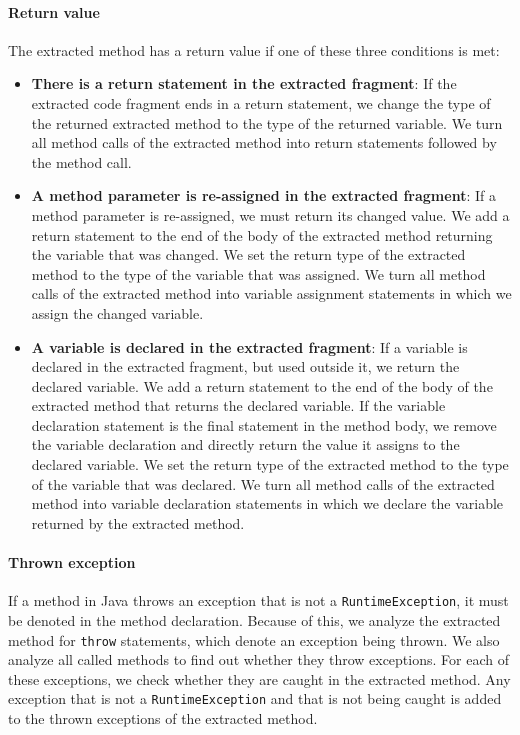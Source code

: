 \paragraph{Return value}\label{sec:refreturn}
The extracted method has a return value if one of these three conditions is met:
\begin{itemize}
\item \textbf{There is a return statement in the extracted fragment}: If the extracted code fragment ends in a return statement, we change the type of the returned extracted method to the type of the returned variable. We turn all method calls of the extracted method into return statements followed by the method call.
\item \textbf{A method parameter is re-assigned in the extracted fragment}: If a method parameter is re-assigned, we must return its changed value. We add a return statement to the end of the body of the extracted method returning the variable that was changed. We set the return type of the extracted method to the type of the variable that was assigned. We turn all method calls of the extracted method into variable assignment statements in which we assign the changed variable.
\item \textbf{A variable is declared in the extracted fragment}: If a variable is declared in the extracted fragment, but used outside it, we return the declared variable. We add a return statement to the end of the body of the extracted method that returns the declared variable. If the variable declaration statement is the final statement in the method body, we remove the variable declaration and directly return the value it assigns to the declared variable. We set the return type of the extracted method to the type of the variable that was declared. We turn all method calls of the extracted method into variable declaration statements in which we declare the variable returned by the extracted method.
\end{itemize}

\paragraph{Thrown exception}
If a method in Java throws an exception that is not a \texttt{RuntimeException}, it must be denoted in the method declaration. Because of this, we analyze the extracted method for \texttt{throw} statements, which denote an exception being thrown. We also analyze all called methods to find out whether they throw exceptions. For each of these exceptions, we check whether they are caught in the extracted method. Any exception that is not a \texttt{RuntimeException} and that is not being caught is added to the thrown exceptions of the extracted method.

